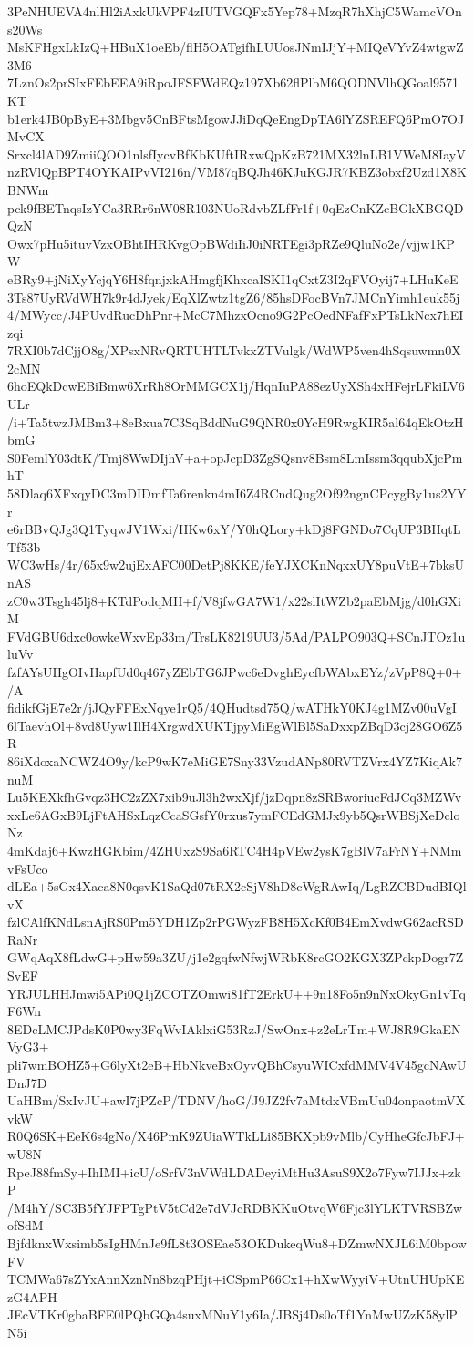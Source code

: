 3PeNHUEVA4nlHl2iAxkUkVPF4zIUTVGQFx5Yep78+MzqR7hXhjC5WamcVOns20Ws
MsKFHgxLkIzQ+HBuX1oeEb/flH5OATgifhLUUosJNmIJjY+MIQeVYvZ4wtgwZ3M6
7LznOs2prSIxFEbEEA9iRpoJFSFWdEQz197Xb62flPlbM6QODNVlhQGoal9571KT
b1erk4JB0pByE+3Mbgv5CnBFtsMgowJJiDqQeEngDpTA6lYZSREFQ6PmO7OJMvCX
Srxcl4lAD9ZmiiQOO1nlsfIycvBfKbKUftIRxwQpKzB721MX32lnLB1VWeM8IayV
nzRVlQpBPT4OYKAIPvVI216n/VM87qBQJh46KJuKGJR7KBZ3obxf2Uzd1X8KBNWm
pck9fBETnqsIzYCa3RRr6nW08R103NUoRdvbZLfFr1f+0qEzCnKZcBGkXBGQDQzN
Owx7pHu5ituvVzxOBhtIHRKvgOpBWdiIiJ0iNRTEgi3pRZe9QluNo2e/vjjw1KPW
eBRy9+jNiXyYcjqY6H8fqnjxkAHmgfjKhxcaISKI1qCxtZ3I2qFVOyij7+LHuKeE
3Ts87UyRVdWH7k9r4dJyek/EqXlZwtz1tgZ6/85hsDFocBVn7JMCnYimh1euk55j
4/MWycc/J4PUvdRucDhPnr+McC7MhzxOcno9G2PcOedNFafFxPTsLkNcx7hEIzqi
7RXI0b7dCjjO8g/XPsxNRvQRTUHTLTvkxZTVulgk/WdWP5ven4hSqsuwmn0X2cMN
6hoEQkDcwEBiBmw6XrRh8OrMMGCX1j/HqnIuPA88ezUyXSh4xHFejrLFkiLV6ULr
/i+Ta5twzJMBm3+8eBxua7C3SqBddNuG9QNR0x0YcH9RwgKIR5al64qEkOtzHbmG
S0FemlY03dtK/Tmj8WwDIjhV+a+opJcpD3ZgSQsnv8Bsm8LmIssm3qqubXjcPmhT
58Dlaq6XFxqyDC3mDIDmfTa6renkn4mI6Z4RCndQug2Of92ngnCPcygBy1us2YYr
e6rBBvQJg3Q1TyqwJV1Wxi/HKw6xY/Y0hQLory+kDj8FGNDo7CqUP3BHqtLTf53b
WC3wHs/4r/65x9w2ujExAFC00DetPj8KKE/feYJXCKnNqxxUY8puVtE+7bksUnAS
zC0w3Tsgh45lj8+KTdPodqMH+f/V8jfwGA7W1/x22slItWZb2paEbMjg/d0hGXiM
FVdGBU6dxc0owkeWxvEp33m/TrsLK8219UU3/5Ad/PALPO903Q+SCnJTOz1uluVv
fzfAYsUHgOIvHapfUd0q467yZEbTG6JPwc6eDvghEycfbWAbxEYz/zVpP8Q+0+/A
fidikfGjE7e2r/jJQyFFExNqye1rQ5/4QHudtsd75Q/wATHkY0KJ4g1MZv00uVgI
6lTaevhOl+8vd8Uyw1IlH4XrgwdXUKTjpyMiEgWlBl5SaDxxpZBqD3cj28GO6Z5R
86iXdoxaNCWZ4O9y/kcP9wK7eMiGE7Sny33VzudANp80RVTZVrx4YZ7KiqAk7nuM
Lu5KEXkfhGvqz3HC2zZX7xib9uJl3h2wxXjf/jzDqpn8zSRBworiucFdJCq3MZWv
xxLe6AGxB9LjFtAHSxLqzCcaSGsfY0rxus7ymFCEdGMJx9yb5QsrWBSjXeDcloNz
4mKdaj6+KwzHGKbim/4ZHUxzS9Sa6RTC4H4pVEw2ysK7gBlV7aFrNY+NMmvFsUco
dLEa+5sGx4Xaca8N0qsvK1SaQd07tRX2cSjV8hD8cWgRAwIq/LgRZCBDudBIQlvX
fzlCAlfKNdLsnAjRS0Pm5YDH1Zp2rPGWyzFB8H5XcKf0B4EmXvdwG62acRSDRaNr
GWqAqX8fLdwG+pHw59a3ZU/j1e2gqfwNfwjWRbK8rcGO2KGX3ZPckpDogr7ZSvEF
YRJULHHJmwi5APi0Q1jZCOTZOmwi81fT2ErkU++9n18Fo5n9nNxOkyGn1vTqF6Wn
8EDcLMCJPdsK0P0wy3FqWvIAklxiG53RzJ/SwOnx+z2eLrTm+WJ8R9GkaENVyG3+
pli7wmBOHZ5+G6lyXt2eB+HbNkveBxOyvQBhCsyuWICxfdMMV4V45gcNAwUDnJ7D
UaHBm/SxIvJU+awI7jPZcP/TDNV/hoG/J9JZ2fv7aMtdxVBmUu04onpaotmVXvkW
R0Q6SK+EeK6s4gNo/X46PmK9ZUiaWTkLLi85BKXpb9vMlb/CyHheGfcJbFJ+wU8N
RpeJ88fmSy+IhIMI+icU/oSrfV3nVWdLDADeyiMtHu3AsuS9X2o7Fyw7IJJx+zkP
/M4hY/SC3B5fYJFPTgPtV5tCd2e7dVJcRDBKKuOtvqW6Fjc3lYLKTVRSBZwofSdM
BjfdknxWxsimb5sIgHMnJe9fL8t3OSEae53OKDukeqWu8+DZmwNXJL6iM0bpowFV
TCMWa67sZYxAnnXznNn8bzqPHjt+iCSpmP66Cx1+hXwWyyiV+UtnUHUpKEzG4APH
JEcVTKr0gbaBFE0lPQbGQa4suxMNuY1y6Ia/JBSj4Ds0oTf1YnMwUZzK58ylPN5i
